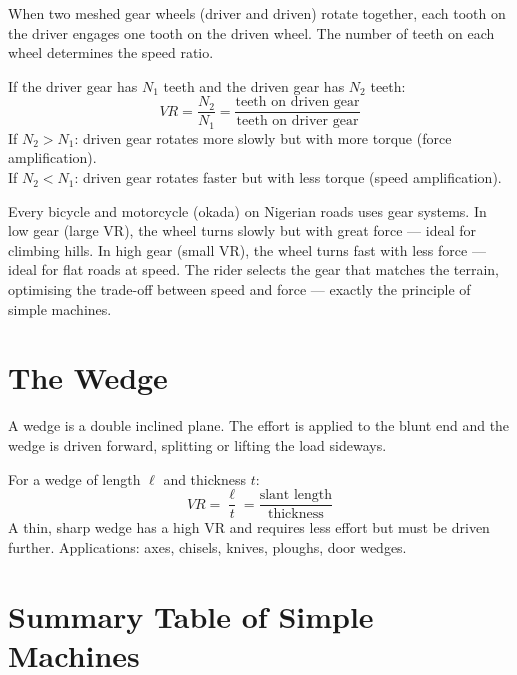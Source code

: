 \begin{processbox}
When two meshed gear wheels (driver and driven)
rotate together, each tooth on the driver engages
one tooth on the driven wheel. The number of teeth
on each wheel determines the speed ratio.

If the driver gear has $N_1$ teeth and the driven
gear has $N_2$ teeth:
\[
  VR = \frac{N_2}{N_1}
  = \frac{\text{teeth on driven gear}}
  {\text{teeth on driver gear}}
\]
If $N_2 > N_1$: driven gear rotates more slowly but
with more torque (force amplification).\\
If $N_2 < N_1$: driven gear rotates faster but with
less torque (speed amplification).
\end{processbox}

\begin{realworldbox}
Every bicycle and motorcycle (okada) on Nigerian
roads uses gear systems. In low gear (large VR),
the wheel turns slowly but with great force ---
ideal for climbing hills. In high gear (small VR),
the wheel turns fast with less force --- ideal for
flat roads at speed. The rider selects the gear
that matches the terrain, optimising the trade-off
between speed and force --- exactly the principle
of simple machines.
\end{realworldbox}

\section{The Wedge}

\begin{processbox}[Wedge]
A wedge is a double inclined plane. The effort
is applied to the blunt end and the wedge is
driven forward, splitting or lifting the load
sideways.

For a wedge of length $\ell$ and thickness $t$:
\[
  VR = \frac{\ell}{t}
  = \frac{\text{slant length}}{\text{thickness}}
\]
A thin, sharp wedge has a high VR and requires
less effort but must be driven further.
Applications: axes, chisels, knives, ploughs,
door wedges.
\end{processbox}

\section{Summary Table of Simple Machines}

